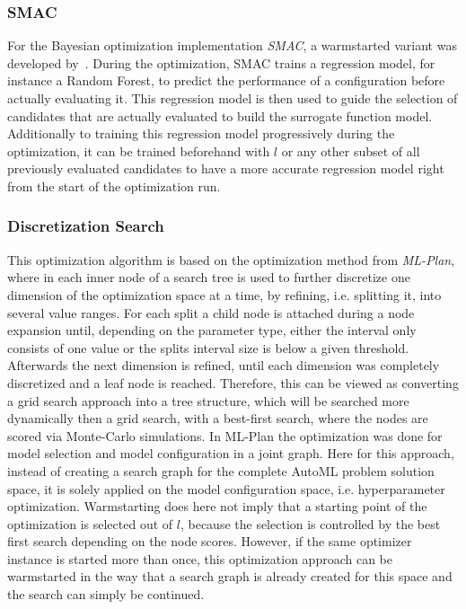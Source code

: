 \subsubsection{SMAC}
For the Bayesian optimization implementation \textit{SMAC}, a warmstarted variant was developed by~\textcite{Lindauer-Smac-Warmstart}.
During the optimization, SMAC trains a regression model, for instance a Random Forest, to predict the performance of a configuration before actually evaluating it.
This regression model is then used to guide the selection of candidates that are actually evaluated to build the surrogate function model.
Additionally to training this regression model progressively during the optimization, it can be trained beforehand with $l$ or any other subset of all previously evaluated candidates to have a more accurate regression model right from the start of the optimization run.

\subsubsection{Discretization Search}
This optimization algorithm is based on the optimization method from \textit{ML-Plan}, where in each inner node of a search tree is used to further discretize one dimension of the optimization space at a time, by refining, i.e. splitting it, into several value ranges.
For each split a child node is attached during a node expansion until, depending on the parameter type, either the interval only consists of one value or the splits interval size is below a given threshold.
Afterwards the next dimension is refined, until each dimension was completely discretized and a leaf node is reached.\newline
Therefore, this can be viewed as converting a grid search approach into a tree structure, which will be searched more dynamically then a grid search, with a best-first search, where the nodes are scored via Monte-Carlo simulations.\newline 
In ML-Plan the optimization was done for model selection and model configuration in a joint graph.
Here for this approach, instead of creating a search graph for the complete AutoML problem solution space, it is solely applied on the model configuration space, i.e. hyperparameter optimization.\newline
Warmstarting does here not imply that a starting point of the optimization is selected out of $l$, because the selection is controlled by the best first search depending on the node scores.
However, if the same optimizer instance is started more than once, this optimization approach can be warmstarted in the way that a search graph is already created for this space and the search can simply be continued.
